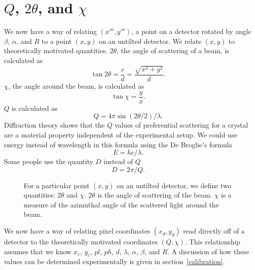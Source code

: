 \section{\texorpdfstring{$Q$, $2\theta$, and $\chi$}{Q, 2theta, and chi}}

We now have a way of relating $(x''',y''')$, 
a point on a detector rotated by angle $\beta$, 
$\alpha$, and $R$ to a point $(x,y)$
on an untilted detector.
We relate $(x,y)$ to theoretically motivated 
quantities. $2\theta$, the angle of scattering 
of a beam, is calculated as
\begin{equation}\label{2thetatermsr}
    \tan2\theta = \frac{r}{d} = \frac{\sqrt{x^2+y^2}}{d}.
\end{equation}
$\chi$, the angle around the beam, is calculated as
\begin{equation}\label{chitermsyx}
    \tan\chi = \frac{y}{x}.
\end{equation}
$Q$ is calculated as
\begin{equation}\label{qterms2theta}
    Q = 4\pi \sin(2\theta/2)/\lambda.
\end{equation}
Diffraction theory shows that the $Q$ values of preferential 
scattering for a crystal are a material property independent 
of the experimental setup. 
We could use energy instead of wavelength in this formula 
using the De Broglie's formula
\begin{equation}
    E = hc/\lambda.
\end{equation}
Some people use the quantity $D$ instead of $Q$
\begin{equation}\label{DtermsQ}
    D = 2\pi/Q.
\end{equation}

\begin{SCfigure}[1][htbp]
    \centering
    
    \caption{For a particular point $(x,y)$ on an 
    untilted detector, we define two quantities:
    $2\theta$ and $\chi$. $2\theta$ is the angle of 
    scattering of the beam. $\chi$ is a measure of the 
    azimuthal angle of the scattered light around 
    the beam.}
    \label{TwoTheta}
\end{SCfigure}

We now have a way of relating pixel
coordinates $(x_d,y_d)$ read directly off
of a detector to the
theoretically motivated coordinates $(Q,\chi)$.
This relationship assumes that we know
$x_c$, $y_c$, $pl$, $ph$, $d$, $\lambda$,
$\alpha$, $\beta$, and $R$. A discussion of
how these values can be determined experimentally
is given in section~\ref{calibration}.

